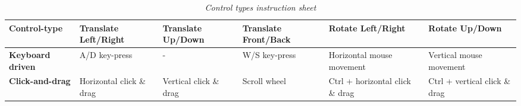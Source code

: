 \begin{table}[h]	
  \centering
	    \begin{tabular}{|p{2.5cm}|p{2.25cm}|p{2.25cm}|p{2.25cm}|p{2.25cm}|p{2.25cm}|}
  	    \hline	
  	    \textbf{Control-type} & \textbf{Translate Left/Right} & \textbf{Translate Up/Down} & \textbf{Translate Front/Back} & \textbf{Rotate Left/Right} & \textbf{Rotate Up/Down} \\
		\hline
		\textbf{Keyboard driven} & A/D key-press & - & W/S key-press & Horizontal mouse movement & Vertical mouse movement \\
		\hline
		\textbf{Click-and-drag} & Horizontal click \& drag & Vertical click \& drag & Scroll wheel & Ctrl + horizontal click \& drag & Ctrl + vertical click \& drag\\
		\hline
		\end{tabular}
		\caption{\textit{Control types instruction sheet}}
		\label{tab:control_types}
\end{table}

